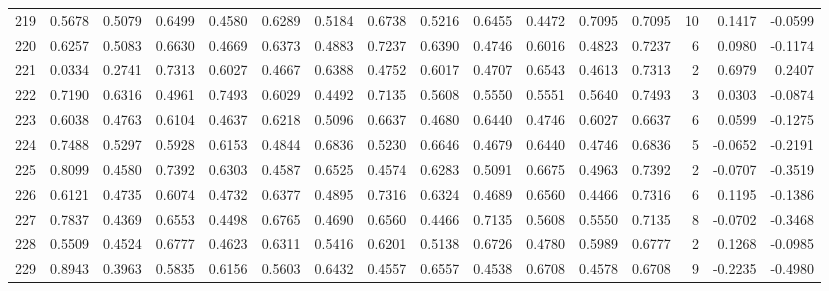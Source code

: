 \begin{tabular}{lrrrrrrrrrrrrrrr}
219 &      0.5678 &  0.5079 &  0.6499 &  0.4580 &  0.6289 &  0.5184 &  0.6738 &  0.5216 &  0.6455 &  0.4472 &   0.7095 &     0.7095 &     10 &                    0.1417 &                    -0.0599 \\
220 &      0.6257 &  0.5083 &  0.6630 &  0.4669 &  0.6373 &  0.4883 &  0.7237 &  0.6390 &  0.4746 &  0.6016 &   0.4823 &     0.7237 &      6 &                    0.0980 &                    -0.1174 \\
221 &      0.0334 &  0.2741 &  0.7313 &  0.6027 &  0.4667 &  0.6388 &  0.4752 &  0.6017 &  0.4707 &  0.6543 &   0.4613 &     0.7313 &      2 &                    0.6979 &                     0.2407 \\
222 &      0.7190 &  0.6316 &  0.4961 &  0.7493 &  0.6029 &  0.4492 &  0.7135 &  0.5608 &  0.5550 &  0.5551 &   0.5640 &     0.7493 &      3 &                    0.0303 &                    -0.0874 \\
223 &      0.6038 &  0.4763 &  0.6104 &  0.4637 &  0.6218 &  0.5096 &  0.6637 &  0.4680 &  0.6440 &  0.4746 &   0.6027 &     0.6637 &      6 &                    0.0599 &                    -0.1275 \\
224 &      0.7488 &  0.5297 &  0.5928 &  0.6153 &  0.4844 &  0.6836 &  0.5230 &  0.6646 &  0.4679 &  0.6440 &   0.4746 &     0.6836 &      5 &                   -0.0652 &                    -0.2191 \\
225 &      0.8099 &  0.4580 &  0.7392 &  0.6303 &  0.4587 &  0.6525 &  0.4574 &  0.6283 &  0.5091 &  0.6675 &   0.4963 &     0.7392 &      2 &                   -0.0707 &                    -0.3519 \\
226 &      0.6121 &  0.4735 &  0.6074 &  0.4732 &  0.6377 &  0.4895 &  0.7316 &  0.6324 &  0.4689 &  0.6560 &   0.4466 &     0.7316 &      6 &                    0.1195 &                    -0.1386 \\
227 &      0.7837 &  0.4369 &  0.6553 &  0.4498 &  0.6765 &  0.4690 &  0.6560 &  0.4466 &  0.7135 &  0.5608 &   0.5550 &     0.7135 &      8 &                   -0.0702 &                    -0.3468 \\
228 &      0.5509 &  0.4524 &  0.6777 &  0.4623 &  0.6311 &  0.5416 &  0.6201 &  0.5138 &  0.6726 &  0.4780 &   0.5989 &     0.6777 &      2 &                    0.1268 &                    -0.0985 \\
229 &      0.8943 &  0.3963 &  0.5835 &  0.6156 &  0.5603 &  0.6432 &  0.4557 &  0.6557 &  0.4538 &  0.6708 &   0.4578 &     0.6708 &      9 &                   -0.2235 &                    -0.4980 \\

\end{tabular}

